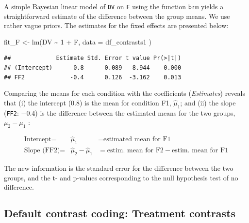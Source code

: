 \documentclass[
  12pt,
]{krantz}
\newenvironment{Shaded}{\begin{snugshade}}{\end{snugshade}}
\newcommand{\AttributeTok}[1]{\textcolor[rgb]{0.77,0.63,0.00}{#1}}
\newcommand{\DecValTok}[1]{\textcolor[rgb]{0.00,0.00,0.81}{#1}}
\newcommand{\FunctionTok}[1]{\textcolor[rgb]{0.00,0.00,0.00}{#1}}
\newcommand{\NormalTok}[1]{#1}
\newcommand{\OtherTok}[1]{\textcolor[rgb]{0.56,0.35,0.01}{#1}}
\newcommand{\SpecialCharTok}[1]{\textcolor[rgb]{0.00,0.00,0.00}{#1}}
\theoremstyle{definition}
\theoremstyle{definition}
\theoremstyle{definition}
\theoremstyle{definition}
\theoremstyle{remark}
\begin{document}
A simple Bayesian linear model of \texttt{DV} on \texttt{F} using the function \texttt{brm} yields a straightforward estimate of the difference between the group means. We use rather vague priors. The estimates for the fixed effects are presented below:

\begin{Shaded}
\begin{Highlighting}[]
\NormalTok{fit\_F }\OtherTok{\textless{}{-}} \FunctionTok{lm}\NormalTok{(DV }\SpecialCharTok{\textasciitilde{}} \DecValTok{1} \SpecialCharTok{+}\NormalTok{ F,}
  \AttributeTok{data =}\NormalTok{ df\_contrasts1}
\NormalTok{)}
\end{Highlighting}
\end{Shaded}

\begin{Shaded}
\end{Shaded}

\begin{verbatim}
##             Estimate Std. Error t value Pr(>|t|)
## (Intercept)      0.8      0.089   8.944    0.000
## FF2             -0.4      0.126  -3.162    0.013
\end{verbatim}

Comparing the means for each condition with the coefficients (\emph{Estimates}) reveals that (i) the intercept (\(0.8\)) is the mean for condition F1, \(\hat\mu_1\); and (ii) the slope (\texttt{FF2}: \(-0.4\)) is the difference between the estimated means for the two groups, \(\mu_2 - \mu_1\) \citep{Bolker2018}:

\begin{equation}
\begin{array}{lcl}
\text{Intercept} = & \hat{\mu}_1 & = \text{estimated mean for F1} \\
\text{Slope (FF2)} = & \hat{\mu}_2 - \hat{\mu}_1 & = \text{estim. mean for F2} - \text{estim. mean for F1} 
\end{array}
\label{def:beta}
\end{equation}

The new information is the standard error for the difference between the two groups, and the t- and p-values corresponding to the null hypothesis test of no difference.

\hypertarget{treatmentcontrasts}{%
\subsection{Default contrast coding: Treatment contrasts}\label{treatmentcontrasts}}
\end{document}
